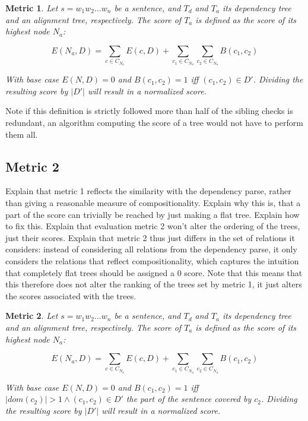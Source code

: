 \documentclass{report}
\theoremstyle{indented}
\newtheorem{metric}{Metric}
\begin{document}
\begin{metric}\label{m1}
Let $s = w_1 w_2 \dots w_n$ be a sentence, and $T_d$ and $T_a$ its dependency tree and an alignment tree, respectively. The score of $T_a$ is defined as the score of its highest node $N_{a}$:

$$
E(N_a,D) = \sum_{c\in C_{N_a}} E(c,D)+ \sum_{c_1\in C_{N_a}} \sum_{c_2\in C_{N_a}} B(c_1,c_2)
$$

\noindent With base case $E(N,D) = 0$ and $B(c_1,c_2) = 1$ iff  $(c_1,c_2)\in D'$. Dividing the resulting score by $|D'|$ will result in a normalized score.
\end{metric}

\noindent  Note if this definition is strictly followed more than half of the sibling checks is redundant, an algorithm computing the score of a tree would not have to perform them all.

\subsection{Metric 2}

Explain that metric 1 reflects the similarity with the dependency parse, rather than giving a reasonable measure of compositionality. Explain why this is, that a part of the score can trivially be reached by just making a flat tree. Explain how to fix this. Explain that evaluation metric 2 won't alter the ordering of the trees, just their scores.
Explain that metric 2 thus just differs in the set of relations it considers: instead of considering all relations from the dependency parse, it only considers the relations that reflect compositionality, which captures the intuition that completely flat trees should be assigned a 0 score. Note that this means that this therefore does not alter the ranking of the trees set by metric 1, it just alters the scores associated with the trees.

\begin{metric}\label{m2}
Let $s = w_1 w_2 \dots w_n$ be a sentence, and $T_d$ and $T_a$ its dependency tree and an alignment tree, respectively. The score of $T_a$ is defined as the score of its highest node $N_{a}$:

$$
E(N_a,D) = \sum_{c\in C_{N_a}} E(c,D)+ \sum_{c_1\in C_{N_a}} \sum_{c_2\in C_{N_a}} B(c_1,c_2)
$$

\noindent With base case $E(N,D) = 0$ and $B(c_1,c_2) = 1$ iff  $|dom(c_2)| > 1 \land (c_1,c_2)\in D'$ the part of the sentence covered by $c_2$. Dividing the resulting score by $|D'|$ will result in a normalized score.
\end{metric}
\end{document}
